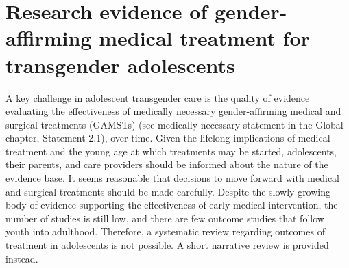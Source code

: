 \documentclass[
]{book}
\begin{document}
\hypertarget{research-evidence-of-gender-affirming-medical-treatment-for-transgender-adolescents}{%
\section*{Research evidence of gender-affirming medical treatment for transgender adolescents}\label{research-evidence-of-gender-affirming-medical-treatment-for-transgender-adolescents}}

A key challenge in adolescent transgender care is
the quality of evidence evaluating the effectiveness
of medically necessary gender-affirming medical
and surgical treatments (GAMSTs) (see medically
necessary statement in the Global chapter,
Statement 2.1), over time. Given the lifelong implications of medical treatment and the young age
at which treatments may be started, adolescents,
their parents, and care providers should be
informed about the nature of the evidence base.
It seems reasonable that decisions to move forward
with medical and surgical treatments should be
made carefully. Despite the slowly growing body
of evidence supporting the effectiveness of early
medical intervention, the number of studies is still
low, and there are few outcome studies that follow
youth into adulthood. Therefore, a systematic
review regarding outcomes of treatment in adolescents is not possible. A short narrative review
is provided instead.
\end{document}
